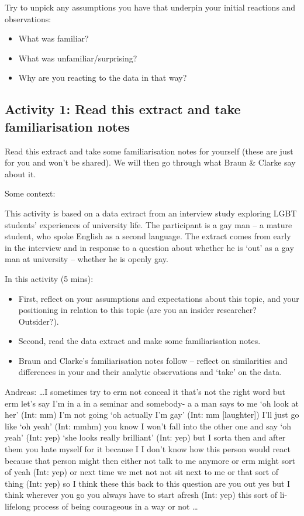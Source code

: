 \documentclass[
  english,
  letterpaper,
  DIV=11,
  numbers=noendperiod]{scrreprt}
\providecommand{\tightlist}{%
  \setlength{\itemsep}{0pt}\setlength{\parskip}{0pt}}
\begin{document}
Try to unpick any assumptions you have that underpin your initial
reactions and observations:

\begin{itemize}
\tightlist
\item
  What was familiar?
\item
  What was unfamiliar/surprising?
\item
  Why are you reacting to the data in that way?
\end{itemize}

\subsection{Activity 1: Read this extract and take familiarisation
notes}\label{activity-1-read-this-extract-and-take-familiarisation-notes}

Read this extract and take some familiarisation notes for yourself
(these are just for you and won't be shared). We will then go through
what Braun \& Clarke say about it.

Some context:

This activity is based on a data extract from an interview study
exploring LGBT students' experiences of university life. The participant
is a gay man -- a mature student, who spoke English as a second
language. The extract comes from early in the interview and in response
to a question about whether he is `out' as a gay man at university --
whether he is openly gay.

In this activity (5 mins):

\begin{itemize}
\tightlist
\item
  First, reflect on your assumptions and expectations about this topic,
  and your positioning in relation to this topic (are you an insider
  researcher? Outsider?).
\item
  Second, read the data extract and make some familiarisation notes.
\item
  Braun and Clarke's familiarisation notes follow -- reflect on
  similarities and differences in your and their analytic observations
  and `take' on the data.
\end{itemize}

\begin{info}
Andreas: \ldots I sometimes try to erm not conceal it that's not the
right word but erm let's say I'm in a in a seminar and somebody- a a man
says to me `oh look at her' (Int: mm) I'm not going `oh actually I'm
gay' (Int: mm {[}laughter{]}) I'll just go like `oh yeah' (Int: mmhm)
you know I won't fall into the other one and say `oh yeah' (Int: yep)
`she looks really brilliant' (Int: yep) but I sorta then and after them
you hate myself for it because I I don't know how this person would
react because that person might then either not talk to me anymore or
erm might sort of yeah (Int: yep) or next time we met not not sit next
to me or that sort of thing (Int: yep) so I think these this back to
this question are you out yes but I think wherever you go you always
have to start afresh (Int: yep) this sort of li- lifelong process of
being courageous in a way or not \ldots{}
\end{info}
\end{document}
